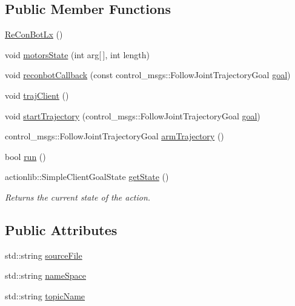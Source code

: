 \subsection*{Public Member Functions}
\begin{DoxyCompactItemize}
\item 
\hyperlink{class_re_con_bot_lx_aa4c8b9071629aceec362d46287da4984}{Re\+Con\+Bot\+Lx} ()
\item 
void \hyperlink{class_re_con_bot_lx_a0e25f573057755c6729ea572362652e6}{motors\+State} (int arg\mbox{[}$\,$\mbox{]}, int length)
\item 
void \hyperlink{class_re_con_bot_lx_a5d60b16962e5ce8e452f7c53543c54ce}{reconbot\+Callback} (const control\+\_\+msgs\+::\+Follow\+Joint\+Trajectory\+Goal \hyperlink{class_re_con_bot_a9bd1c7ddf2376e2e68ea5d8bd8c3f505}{goal})
\item 
void \hyperlink{class_re_con_bot_ab859fa96532995d3c1545aaa9db1802e}{traj\+Client} ()
\item 
void \hyperlink{class_re_con_bot_ade3eb1a4752d45659321209f5730cef3}{start\+Trajectory} (control\+\_\+msgs\+::\+Follow\+Joint\+Trajectory\+Goal \hyperlink{class_re_con_bot_a9bd1c7ddf2376e2e68ea5d8bd8c3f505}{goal})
\item 
control\+\_\+msgs\+::\+Follow\+Joint\+Trajectory\+Goal \hyperlink{class_re_con_bot_a950f2769ca61ff7b663d86ed2cf19c14}{arm\+Trajectory} ()
\item 
bool \hyperlink{class_re_con_bot_ac264f3082203c3b2ef13b6f353476ca7}{run} ()
\item 
actionlib\+::\+Simple\+Client\+Goal\+State \hyperlink{class_re_con_bot_a3d9656755c06ded1f3b88ce05565f758}{get\+State} ()
\begin{DoxyCompactList}\small\item\em Returns the current state of the action. \end{DoxyCompactList}\end{DoxyCompactItemize}
\subsection*{Public Attributes}
\begin{DoxyCompactItemize}
\item 
std\+::string \hyperlink{class_re_con_bot_a65cf4bed9bbabd92e1265d05507e0945}{source\+File}
\item 
std\+::string \hyperlink{class_re_con_bot_a40ca07cd606988b78664c4a52fd8dc59}{name\+Space}
\item 
std\+::string \hyperlink{class_re_con_bot_a1d91d2ea8c0f16340440357906fb9ebf}{topic\+Name}
\end{DoxyCompactItemize}
